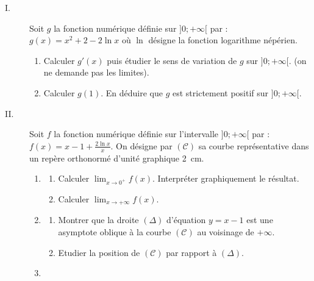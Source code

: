      \begin{description}
            \item[I.]
                  Soit $g$ la fonction numérique définie sur $]0 ; +\infty [$ par : $g(x) = x^2 +2 - 2 \ln x$
                  où $\ln$ désigne la fonction logarithme népérien.
                  \begin{enumerate}
                        \item Calculer $g'(x)$ puis étudier le sens de variation de $g$ sur $]0 ; +\infty[$. 
                              (on ne demande pas les limites).
                        \item Calculer $g(1)$. 
                              En déduire que $g$ est strictement positif sur $]0 ; +\infty[$.
                  \end{enumerate}
            \item[II.]
                  Soit $f$ la fonction numérique définie sur l’intervalle $] 0 ; +\infty[$ par :
                  $f(x) = x - 1 + \frac{2 \ln x}{x}$.
                  On désigne par $(\mathscr{C})$ sa courbe représentative dans un repère orthonormé
                  d'unité graphique 2~cm.
                  \begin{enumerate}
                        \item \begin{enumerate}
                                    \item Calculer $\displaystyle{\lim_{x\rightarrow 0^+}f(x)}$. 
                                          Interpréter graphiquement le résultat.
                                    \item Calculer $\displaystyle{\lim_{x\rightarrow +\infty}f(x)}$.
                              \end{enumerate}
                        \item \begin{enumerate}
                                    \item Montrer que la droite $(\Delta)$ d'\'equation $y=x-1$ est une asymptote oblique 
                                          \`a la courbe $(\mathscr{C})$ au voisinage de $+\infty$.
                                    \item Etudier la position de $(\mathscr{C})$ par rapport \`a $(\Delta)$.
                              \end{enumerate}
                        \item \begin{enumerate}

\end{enumerate}
\end{enumerate}
\end{description}
